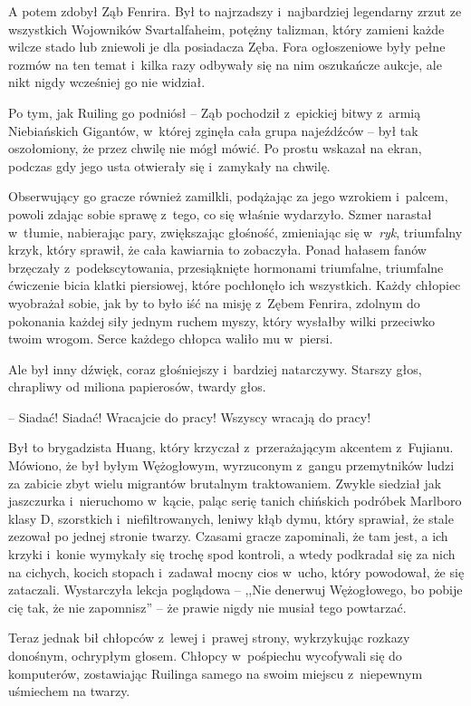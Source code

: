 \documentclass[oneside,polish,11pt,rmheadings]{mwbk}
\begin{document}
A potem zdobył Ząb Fenrira. Był to najrzadszy i~najbardziej legendarny zrzut ze wszystkich Wojowników Svartalfaheim, potężny talizman, który zamieni każde wilcze stado lub zniewoli je dla posiadacza Zęba. Fora ogłoszeniowe były pełne rozmów na ten temat i~kilka razy odbywały się na nim oszukańcze aukcje, ale nikt nigdy wcześniej go nie widział.

Po tym, jak Ruiling go podniósł -- Ząb pochodził z~epickiej bitwy z~armią Niebiańskich Gigantów, w~której zginęła cała grupa najeźdźców -- był tak oszołomiony, że przez chwilę nie mógł mówić. Po prostu wskazał na ekran, podczas gdy jego usta otwierały się i~zamykały na chwilę.

Obserwujący go gracze również zamilkli, podążając za jego wzrokiem i~palcem, powoli zdając sobie sprawę z~tego, co się właśnie wydarzyło. Szmer narastał w~tłumie, nabierając pary, zwiększając głośność, zmieniając się w~\textit{ryk}, triumfalny krzyk, który sprawił, że cała kawiarnia to zobaczyła. Ponad hałasem fanów brzęczały z~podekscytowania, przesiąknięte hormonami triumfalne, triumfalne ćwiczenie bicia klatki piersiowej, które pochłonęło ich wszystkich. Każdy chłopiec wyobrażał sobie, jak by to było iść na misję z~Zębem Fenrira, zdolnym do pokonania każdej siły jednym ruchem myszy, który wysłałby wilki przeciwko twoim wrogom. Serce każdego chłopca waliło mu w~piersi.

Ale był inny dźwięk, coraz głośniejszy i~bardziej natarczywy. Starszy głos, chrapliwy od miliona papierosów, twardy głos. 

-- Siadać! Siadać! Wracajcie do pracy! Wszyscy wracają do pracy!

Był to brygadzista Huang, który krzyczał z~przerażającym akcentem z~Fujianu. Mówiono, że był byłym Wężogłowym, wyrzuconym z~gangu przemytników ludzi za zabicie zbyt wielu migrantów brutalnym traktowaniem. Zwykle siedział jak jaszczurka i~nieruchomo w~kącie, paląc serię tanich chińskich podróbek Marlboro klasy D, szorstkich i~niefiltrowanych, leniwy kłąb dymu, który sprawiał, że stale zezował po jednej stronie twarzy. Czasami gracze zapominali, że tam jest, a ich krzyki i~konie wymykały się trochę spod kontroli, a wtedy podkradał się za nich na cichych, kocich stopach i~zadawał mocny cios w~ucho, który powodował, że się zataczali. Wystarczyła lekcja poglądowa -- ,,Nie denerwuj Wężogłowego, bo pobije cię tak, że nie zapomnisz'' -- że prawie nigdy nie musiał tego powtarzać.

Teraz jednak bił chłopców z~lewej i~prawej strony, wykrzykując rozkazy donośnym, ochrypłym głosem. Chłopcy w~pośpiechu wycofywali się do komputerów, zostawiając Ruilinga samego na swoim miejscu z~niepewnym uśmiechem na twarzy.
\end{document}
